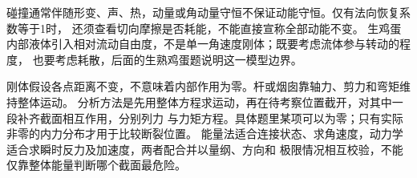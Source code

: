 碰撞通常伴随形变、声、热，动量或角动量守恒不保证动能守恒。仅有法向恢复系数等于1时，
还须查看切向摩擦是否耗能，不能直接宣称全部动能不变。
生鸡蛋内部液体引入相对流动自由度，不是单一角速度刚体；既要考虑流体参与转动的程度，
也要考虑耗散，后面的生熟鸡蛋题说明这一模型边界。

刚体假设各点距离不变，不意味着内部作用为零。杆或烟囱靠轴力、剪力和弯矩维持整体运动。
分析方法是先用整体方程求运动，再在待考察位置截开，对其中一段补齐截面相互作用，分别列力
与力矩方程。具体题里某项可以为零；只有实际非零的内力分布才用于比较断裂位置。
能量法适合连接状态、求角速度，动力学适合求瞬时反力及加速度，两者配合并以量纲、方向和
极限情况相互校验，不能仅靠整体能量判断哪个截面最危险。
